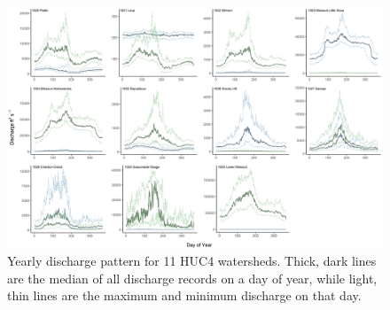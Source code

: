 \documentclass[12pt,]{article}
\makeatletter
\def\maxwidth{\ifdim\Gin@nat@width>\linewidth\linewidth\else\Gin@nat@width\fi}
\makeatother
\begin{document}
\begin{figure}
\includegraphics[width=\maxwidth]{../../Figures/discharge} \caption{\label{fig:dispattern}Yearly discharge pattern for 11 HUC4 watersheds. Thick, dark lines are the median of all discharge records on a day of year, while light, thin lines are the maximum and minimum discharge on that day.}\label{fig:dispattern}
\end{figure}
\end{document}

